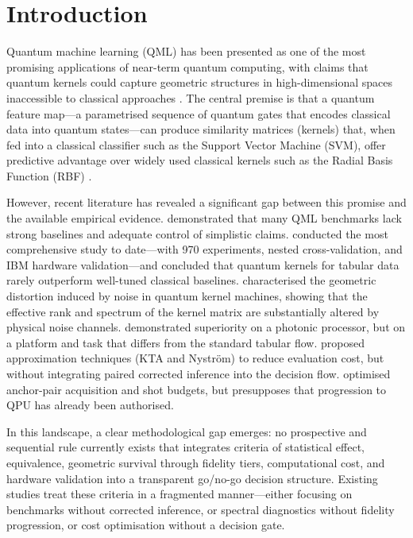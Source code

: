 \documentclass[11pt,a4paper]{article}
\begin{document}
\section{Introduction}
\label{sec:intro}

Quantum machine learning (QML) has been presented as one of the most promising
applications of near-term quantum computing, with claims that quantum kernels
could capture geometric structures in high-dimensional spaces inaccessible to
classical approaches \citep{bowles2024better,heyrand2022noisy}. The central
premise is that a quantum feature map---a parametrised sequence of quantum gates
that encodes classical data into quantum states---can produce similarity
matrices (kernels) that, when fed into a classical classifier such as the
Support Vector Machine (SVM), offer predictive advantage over widely used
classical kernels such as the Radial Basis Function (RBF)
\citep{kakavand2026benchmarking}.

However, recent literature has revealed a significant gap between this promise
and the available empirical evidence. \citet{bowles2024better} demonstrated
that many QML benchmarks lack strong baselines and adequate control of
simplistic claims. \citet{kakavand2026benchmarking} conducted the most
comprehensive study to date---with 970 experiments, nested cross-validation,
and IBM hardware validation---and concluded that quantum kernels for tabular
data rarely outperform well-tuned classical baselines.
\citet{heyrand2022noisy} characterised the geometric distortion induced by
noise in quantum kernel machines, showing that the effective rank and spectrum
of the kernel matrix are substantially altered by physical noise channels.
\citet{yin2025experimental} demonstrated superiority on a photonic processor,
but on a platform and task that differs from the standard tabular flow.
\citet{sahin2025quantum} proposed approximation techniques (KTA and
Nystr\"om) to reduce evaluation cost, but without integrating paired
corrected inference into the decision flow.
\citet{aqka2026active} optimised anchor-pair acquisition and shot budgets, but
presupposes that progression to QPU has already been authorised.

In this landscape, a clear methodological gap emerges: no prospective and
sequential rule currently exists that integrates criteria of statistical effect,
equivalence, geometric survival through fidelity tiers, computational cost, and
hardware validation into a transparent go/no-go decision structure. Existing
studies treat these criteria in a fragmented manner---either focusing on
benchmarks without corrected inference, or spectral diagnostics without fidelity
progression, or cost optimisation without a decision gate.
\end{document}
